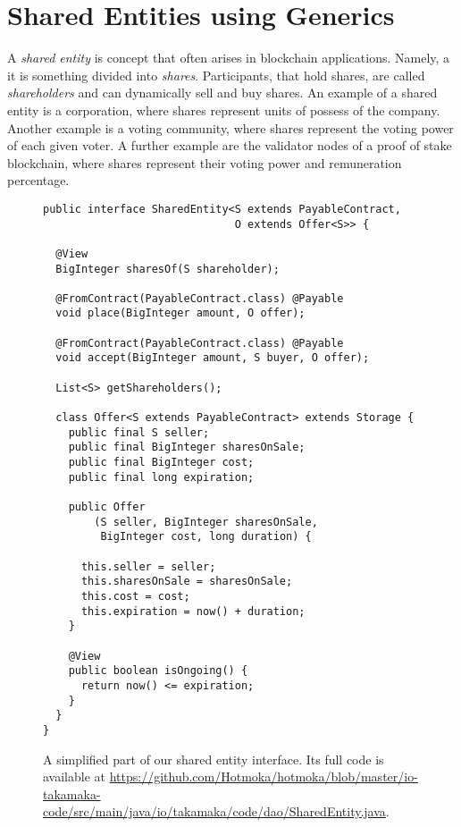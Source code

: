 \section{Shared Entities using Generics}\label{sec:shared_entities}

A \emph{shared entity} is concept that often arises in blockchain
applications. Namely, a it is something divided into \emph{shares}. Participants,
that hold shares, are called \emph{shareholders} and can dynamically
sell and buy shares. An example of a shared entity is a corporation,
where shares represent units of possess of the company. Another example is
a voting community, where shares represent the voting power of each given voter.
A further example are the validator nodes of a proof of stake blockchain,
where shares represent their voting power and remuneration percentage.

\begin{figure}[ht]
  \begin{center}
    \begin{lstlisting}[language=Takamaka]
public interface SharedEntity<S extends PayableContract,
                              O extends Offer<S>> {

  @View
  BigInteger sharesOf(S shareholder);

  @FromContract(PayableContract.class) @Payable
  void place(BigInteger amount, O offer);

  @FromContract(PayableContract.class) @Payable
  void accept(BigInteger amount, S buyer, O offer);

  List<S> getShareholders();

  class Offer<S extends PayableContract> extends Storage {
    public final S seller;
    public final BigInteger sharesOnSale;
    public final BigInteger cost;
    public final long expiration;

    public Offer
        (S seller, BigInteger sharesOnSale, 
         BigInteger cost, long duration) {

      this.seller = seller;
      this.sharesOnSale = sharesOnSale;
      this.cost = cost;
      this.expiration = now() + duration;
    }

    @View
    public boolean isOngoing() {
      return now() <= expiration;
    }
  }
}
    \end{lstlisting}
  \end{center}
  \caption{A simplified part of our shared entity interface.
  Its full code is available at \url{https://github.com/Hotmoka/hotmoka/blob/master/io-takamaka-code/src/main/java/io/takamaka/code/dao/SharedEntity.java}.}\label{fig:shared_entity}
\end{figure}

